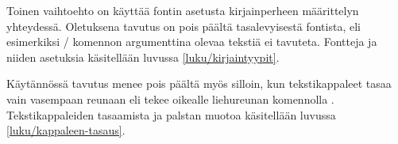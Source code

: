 Toinen vaihtoehto on käyttää fontin asetusta  kirjainperheen määrittelyn yhteydessä. Oletuksena tavutus on
pois päältä tasalevyisestä fontista, eli esimerkiksi \-/
komennon argumenttina olevaa tekstiä ei tavuteta. Fontteja ja niiden
asetuksia käsitellään luvussa \ref{luku/kirjaintyypit}.

Käytännössä tavutus menee pois päältä myös silloin, kun tekstikappaleet
tasaa vain vasempaan reunaan eli tekee oikealle liehureunan komennolla
. Tekstikappaleiden tasaamista ja palstan muotoa
käsitellään luvussa \ref{luku/kappaleen-tasaus}.
